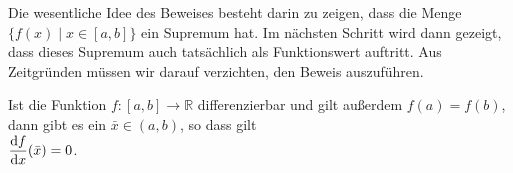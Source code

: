Die wesentliche Idee des Beweises besteht darin zu zeigen, dass die Menge $\{f(x) \mid x \in [a,b]\}$ ein Supremum hat.
Im n\"achsten Schritt wird dann gezeigt, dass dieses Supremum auch tats\"achlich als Funktionswert auftritt.
Aus Zeitgr\"unden m\"ussen wir darauf verzichten, den Beweis auszuf\"uhren.

\begin{Satz}
  Ist die Funktion \mbox{$f:[a,b]\rightarrow \mathbb{R}$} differenzierbar und gilt au{\ss}er\-dem $f(a) = f(b)$, dann gibt es ein
  $\bar{x} \in (a,b)$, so dass gilt 
  \\[0.3cm]
  \hspace*{1.3cm}
  $\displaystyle\frac{\textrm{d}f}{\textrm{d}x}(\bar{x}) = 0$.  
\end{Satz}

